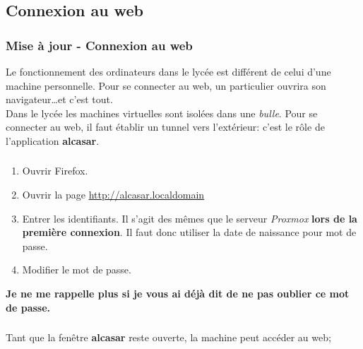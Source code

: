 \documentclass[svgnames,11pt]{beamer}
\begin{document}
\subsection{Connexion au web}
\begin{frame}
    \frametitle{Mise à jour - Connexion au web}

    \begin{aretenir}[Observation]
Le fonctionnement des ordinateurs dans le lycée est différent de celui d'une machine personnelle. Pour se connecter au web, un particulier ouvrira son navigateur\dots et c'est tout.\\
Dans le lycée les machines virtuelles sont isolées dans une \emph{bulle}. Pour se connecter au web, il faut établir un tunnel vers l'extérieur: c'est le rôle de l'application \textbf{alcasar}.
    \end{aretenir}

\end{frame}
\begin{frame}
    \frametitle{}

    \begin{activite}
        \begin{enumerate}
            \item Ouvrir Firefox.
            \item Ouvrir la page \url{http://alcasar.localdomain}
            \item Entrer les identifiants. Il s'agit des mêmes que le serveur \emph{Proxmox} \textbf{lors de la première connexion}. Il faut donc utiliser la date de naissance pour mot de passe.
            \item Modifier le mot de passe. 
            
        \end{enumerate}
        \end{activite}
        \begin{framed}
            \centering \textbf{Je ne me rappelle plus si je vous ai déjà dit de ne pas oublier ce mot de passe.}
        \end{framed}
\end{frame}
\begin{frame}
    \frametitle{}

    \begin{aretenir}[Observation]
    Tant que la fenêtre \textbf{alcasar} reste ouverte, la machine peut accéder au web;
    \end{aretenir}

\end{frame}
\end{document}
